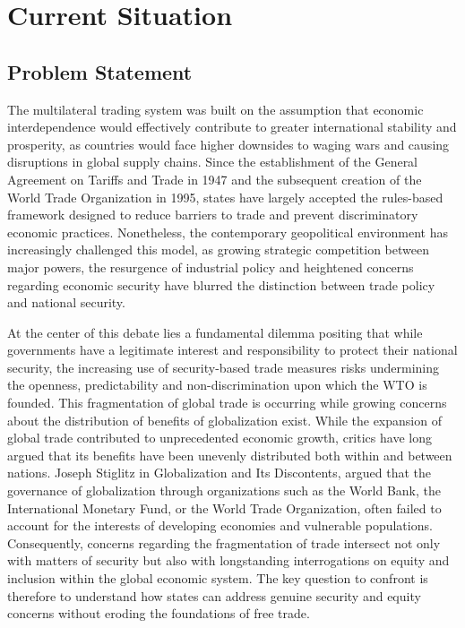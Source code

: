\section{Current Situation}

\subsection{Problem Statement}

The multilateral trading system was built on the assumption that economic interdependence would effectively contribute to greater international stability and prosperity, as countries would face higher downsides to waging wars and causing disruptions in global supply chains. Since the establishment of the General Agreement on Tariffs and Trade in 1947 and the subsequent creation of the World Trade Organization in 1995, states have largely accepted the rules-based framework designed to reduce barriers to trade and prevent discriminatory economic practices. Nonetheless, the contemporary geopolitical environment has increasingly challenged this model, as growing strategic competition between major powers, the resurgence of industrial policy and heightened concerns regarding economic security have blurred the distinction between trade policy and national security.

At the center of this debate lies a fundamental dilemma positing that while governments have a legitimate interest and responsibility to protect their national security, the increasing use of security-based trade measures risks undermining the openness, predictability and non-discrimination upon which the WTO is founded. This fragmentation of global trade is occurring while growing concerns about the distribution of benefits of globalization exist. While the expansion of global trade contributed to unprecedented economic growth, critics have long argued that its benefits have been unevenly distributed both within and between nations. Joseph Stiglitz in Globalization and Its Discontents, argued that the governance of globalization through organizations such as the World Bank, the International Monetary Fund, or the World Trade Organization, often failed to account for the interests of developing economies and vulnerable populations. Consequently, concerns regarding the fragmentation of trade intersect not only with matters of security but also with longstanding interrogations on equity and inclusion within the global economic system. The key question to confront is therefore to understand how states can address genuine security and equity concerns without eroding the foundations of free trade.

